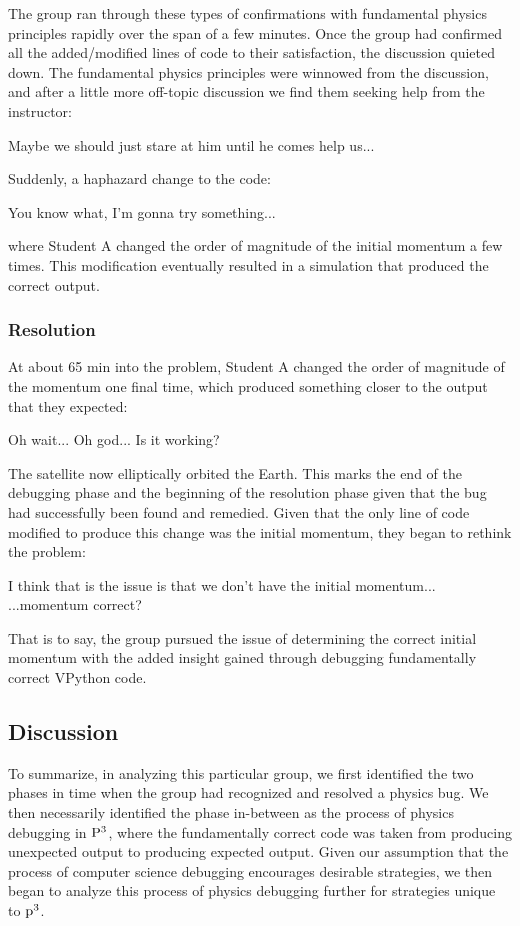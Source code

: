 \documentclass{msuphddissertation}
\begin{document}
\begin{doublespace}
The group ran through these types of confirmations with fundamental physics principles rapidly over the span of a few minutes. Once the group had confirmed all the added/modified lines of code to their satisfaction, the discussion quieted down. The fundamental physics principles were winnowed from the discussion, and after a little more off-topic discussion we find them seeking help from the instructor:\begin{description}
\SD  Maybe we should just stare at him until he comes help us...\end{description} Suddenly, a haphazard change to the code:\begin{description}
\SA You know what, I'm gonna try something... \end{description} where Student A changed the order of magnitude of the initial momentum a few times. This modification eventually resulted in a simulation that produced the correct output.

\subsubsection{Resolution}

At about 65 min into the problem, Student A changed the order of magnitude of the momentum one final time, which produced something closer to the output that they expected: \begin{description}
\SA Oh wait... Oh god...
\SD Is it working?\end{description}  The satellite now elliptically orbited the Earth. This marks the end of the debugging phase and the beginning of the resolution phase given that the bug had successfully been found and remedied. Given that the only line of code modified to produce this change was the initial momentum, they began to rethink the problem: \begin{description}
\SD I think that is the issue is that we don't have the initial momentum...
\SA ...momentum correct?\end{description}  That is to say, the group pursued the issue of determining the correct initial momentum with the added insight gained through debugging fundamentally correct VPython code.

\subsection{Discussion}

To summarize, in analyzing this particular group, we first identified the two phases in time when the group had recognized and resolved a physics bug. We then necessarily identified the phase in-between as the process of physics debugging in ${\rm P}^{3}$, where the fundamentally correct code was taken from producing unexpected output to producing expected output. Given our assumption that the process of computer science debugging encourages desirable strategies, we then began to analyze this process of physics debugging further for strategies unique to ${\rm p}^{3}$.


\end{doublespace}
\end{document}
